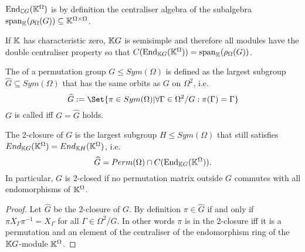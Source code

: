 \documentclass[fontsize=11pt,fleqn,a4paper]{scrartcl}
\begin{document}
\begin{remark}
$\operatorname{End}_{\mathbb{C} G}(\mathbb{K}^\Omega)$ is by definition the centraliser algebra of the subalgebra $\operatorname{span}_{\mathbb{K}}(\rho_\Omega(G)) \subseteq \mathbb{K}^{\Omega\times\Omega}$.

If $\mathbb{K}$ has characteristic zero, $\mathbb{K} G$ is semisimple and therefore all modules have the double centraliser property so that $C(\operatorname{End}_{\mathbb{K} G}(\mathbb{K}^\Omega)) = \operatorname{span}_{\mathbb{K}}(\rho_\Omega(G))$.
\end{remark}

\begin{definition}
The  of a permutation group $G\leq Sym(\Omega)$ is defined as the largest subgroup $\widehat{G}\subseteq Sym(\Omega)$ that has the same orbits as $G$ on $\Omega^2$, i.e.
\[\widehat{G} := \Set{\pi\in Sym(\Omega) | \forall \Gamma\in \Omega^2/G: \pi(\Gamma) = \Gamma}\]
$G$ is called  iff $G=\widehat{G}$ holds.
\end{definition}

\begin{lemma}\label{two_closure:in_terms_of_endomorphisms}
The 2-closure of $G$ is the largest subgroup $H\leq Sym(\Omega)$ that still satisfies $End_{\mathbb{K} G}(\mathbb{K}^\Omega) = End_{\mathbb{K} H}(\mathbb{K}^\Omega)$, i.e.
\[\widehat{G} = Perm(\Omega) \cap C(\operatorname{End}_{\mathbb{K} G}(\mathbb{K}^\Omega)).\]
In particular, $G$ is 2-closed if no permutation matrix outside $G$ commutes with all endomorphisms of $\mathbb{K}^\Omega$.
\end{lemma}
\begin{proof}
Let $\widehat{G}$ be the 2-closure of $G$. By definition $\pi\in\widehat{G}$ if and only if $\pi X_\Gamma \pi^{-1} = X_\Gamma$ for all $\Gamma\in\Omega^2/G$. In other words $\pi$ is in the 2-closure iff it is a permutation and an element of the centraliser of the endomorphism ring of the $\mathbb{K} G$-module $\mathbb{K}^\Omega$.
\end{proof}
\end{document}
